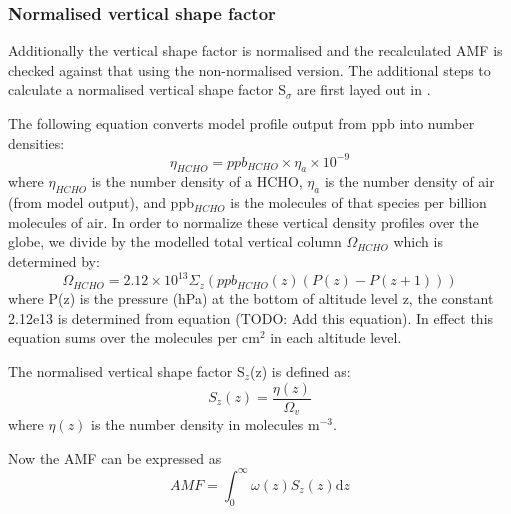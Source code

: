     \subsubsection{Normalised vertical shape factor}
      \label{Model:omiRecalc:normalising_shapefactor}
    
      Additionally the vertical shape factor is normalised and the recalculated AMF is checked against that using the non-normalised version.
      The additional steps to calculate a normalised vertical shape factor S$_\sigma$ are first layed out in \textcite{Palmer2001}.
      
      The following equation converts model profile output from ppb into number densities:
      \begin{equation} \label{Model:omiRecalc:eqn_ppb_to_n}
      \eta_{HCHO} = ppb_{HCHO} \times \eta_a \times 10^{-9}
      \end{equation}
      where $\eta_{HCHO}$ is the number density of a HCHO, $\eta_a$ is the number density of air (from model output), and ppb$_{HCHO}$ is the molecules of that species per billion molecules of air.
      In order to normalize these vertical density profiles over the globe, we divide by the modelled total vertical column $\Omega_{HCHO}$ which is determined by:
      \begin{equation*}
      \Omega_{HCHO} = 2.12\times 10^{13} \Sigma_z \left( ppb_{HCHO}(z) (P(z)-P(z+1)) \right)
      \end{equation*}
      where P(z) is the pressure (hPa) at the bottom of altitude level z, the constant 2.12e13 is determined from equation (TODO: Add this equation).
      In effect this equation sums over the molecules per cm$^2$ in each altitude level.
      
      The normalised vertical shape factor S$_z$(z) is defined as:
      \begin{equation} \label{Model:omiRecalc:eqn_ShapeFactor}
      S_z(z) = \frac{\eta(z)}{\Omega_v}
      \end{equation}
      where $\eta(z)$ is the number density in molecules m$^{-3}$.
      
      Now the AMF can be expressed as
      \begin{equation} \label{Model:omiRecalc:eqn_AMFintwSdz}
      AMF = \int_0^\infty \omega(z) S_z(z) \mathrm{d}z
      \end{equation}
      
